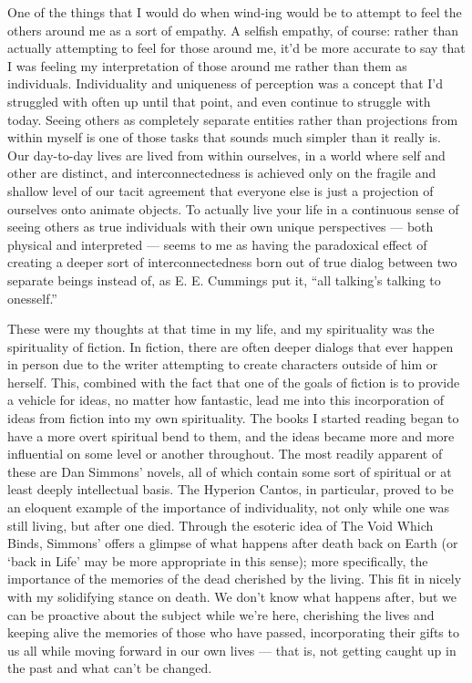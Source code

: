 One of the things that I would do when wind-ing would be to attempt to feel the others around me as a sort of empathy. A selfish empathy, of course: rather than actually attempting to feel for those around me, it'd be more accurate to say that I was feeling my interpretation of those around me rather than them as individuals. Individuality and uniqueness of perception was a concept that I'd struggled with often up until that point, and even continue to struggle with today. Seeing others as completely separate entities rather than projections from within myself is one of those tasks that sounds much simpler than it really is. Our day-to-day lives are lived from within ourselves, in a world where self and other are distinct, and interconnectedness is achieved only on the fragile and shallow level of our tacit agreement that everyone else is just a projection of ourselves onto animate objects. To actually live your life in a continuous sense of seeing others as true individuals with their own unique perspectives --- both physical and interpreted --- seems to me as having the paradoxical effect of creating a deeper sort of interconnectedness born out of true dialog between two separate beings instead of, as E. E. Cummings put it, ``all talking's talking to onesself.''

These were my thoughts at that time in my life, and my spirituality was the spirituality of fiction. In fiction, there are often deeper dialogs that ever happen in person due to the writer attempting to create characters outside of him or herself. This, combined with the fact that one of the goals of fiction is to provide a vehicle for ideas, no matter how fantastic, lead me into this incorporation of ideas from fiction into my own spirituality. The books I started reading began to have a more overt spiritual bend to them, and the ideas became more and more influential on some level or another throughout. The most readily apparent of these are Dan Simmons' novels, all of which contain some sort of spiritual or at least deeply intellectual basis. The Hyperion Cantos, in particular, proved to be an eloquent example of the importance of individuality, not only while one was still living, but after one died. Through the esoteric idea of The Void Which Binds, Simmons' offers a glimpse of what happens after death back on Earth (or `back in Life' may be more appropriate in this sense); more specifically, the importance of the memories of the dead cherished by the living. This fit in nicely with my solidifying stance on death. We don't know what happens after, but we can be proactive about the subject while we're here, cherishing the lives and keeping alive the memories of those who have passed, incorporating their gifts to us all while moving forward in our own lives --- that is, not getting caught up in the past and what can't be changed.

